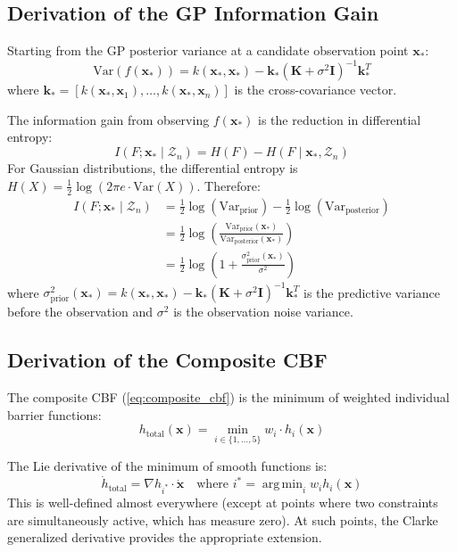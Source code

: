 \documentclass[12pt,a4paper]{article}
\DeclareRobustCommand{\cZ}{\mathcal{Z}}
\DeclareRobustCommand{\vect}[1]{\bm{#1}}
\DeclareRobustCommand{\mat}[1]{\bm{#1}}
\DeclareMathOperator*{\argmin}{arg\,min}
\begin{document}
\subsection{Derivation of the GP Information Gain}

Starting from the GP posterior variance at a candidate observation point $\vect{x}_*$:
\begin{equation}
    \text{Var}(f(\vect{x}_*)) = k(\vect{x}_*, \vect{x}_*) - \vect{k}_*(\mat{K} + \sigma^2\mat{I})^{-1}\vect{k}_*^T
\end{equation}
where $\vect{k}_* = [k(\vect{x}_*, \vect{x}_1), \ldots, k(\vect{x}_*, \vect{x}_n)]$ is the cross-covariance vector.

The information gain from observing $f(\vect{x}_*)$ is the reduction in differential entropy:
\begin{equation}
    I(F; \vect{x}_* \mid \cZ_n) = H(F) - H(F \mid \vect{x}_*, \cZ_n)
\end{equation}
For Gaussian distributions, the differential entropy is $H(X) = \frac{1}{2}\log(2\pi e \cdot \text{Var}(X))$. Therefore:
\begin{align}
    I(F; \vect{x}_* \mid \cZ_n) &= \frac{1}{2}\log(\text{Var}_{\text{prior}}) - \frac{1}{2}\log(\text{Var}_{\text{posterior}}) \\
    &= \frac{1}{2}\log\left(\frac{\text{Var}_{\text{prior}}(\vect{x}_*)}{\text{Var}_{\text{posterior}}(\vect{x}_*)}\right) \\
    &= \frac{1}{2}\log\left(1 + \frac{\sigma^2_{\text{prior}}(\vect{x}_*)}{\sigma^2}\right)
\end{align}
where $\sigma^2_{\text{prior}}(\vect{x}_*) = k(\vect{x}_*, \vect{x}_*) - \vect{k}_*(\mat{K} + \sigma^2\mat{I})^{-1}\vect{k}_*^T$ is the predictive variance before the observation and $\sigma^2$ is the observation noise variance.

\subsection{Derivation of the Composite CBF}

The composite CBF (\eqref{eq:composite_cbf}) is the minimum of weighted individual barrier functions:
\begin{equation}
    h_{\text{total}}(\vect{x}) = \min_{i \in \{1,\ldots,5\}} w_i \cdot h_i(\vect{x})
\end{equation}

The Lie derivative of the minimum of smooth functions is:
\begin{equation}
    \dot{h}_{\text{total}} = \nabla h_{i^*} \cdot \dot{\vect{x}} \quad \text{where } i^* = \argmin_i w_i h_i(\vect{x})
\end{equation}
This is well-defined almost everywhere (except at points where two constraints are simultaneously active, which has measure zero). At such points, the Clarke generalized derivative provides the appropriate extension.
\end{document}
